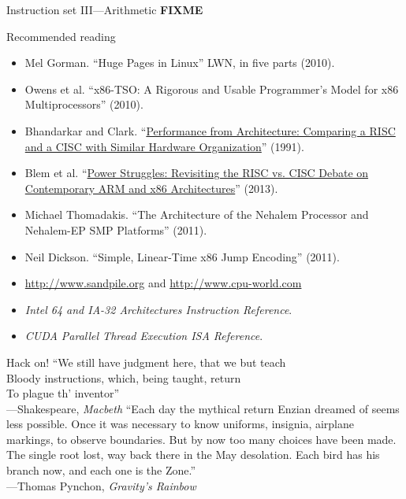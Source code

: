 \documentclass[mathserif,xcolor={dvipsnames,table}]{beamer}
\begin{document}
\begin{frame}{Instruction set III---Arithmetic}
\huge\textbf{FIXME}
\end{frame}

\begin{frame}{Recommended reading}
\footnotesize{
\begin{itemize}
\item Mel Gorman. ``Huge Pages in Linux'' LWN, in five parts (2010).
\item Owens et al. ``x86-TSO: A Rigorous and Usable Programmer's Model for x86 Multiprocessors'' (2010).
\item Bhandarkar and Clark. ``\href{http://dl.acm.org/citation.cfm?id=107003}{Performance from Architecture: Comparing a
RISC and a CISC with Similar Hardware Organization}'' (1991).
\vfill
\item Blem et al. ``\href{http://research.cs.wisc.edu/vertical/papers/2013/hpca13-isa-power-struggles.pdf}{Power Struggles: Revisiting the RISC vs. CISC Debate on
Contemporary ARM and x86 Architectures}'' (2013).
\vfill
\item Michael Thomadakis. ``The Architecture of the Nehalem Processor and
Nehalem-EP SMP Platforms'' (2011).
\vfill
\item Neil Dickson. ``Simple, Linear-Time x86 Jump Encoding'' (2011).
\vfill
\item \href{http://www.sandpile.org}{http://www.sandpile.org} and 
\href{http://www.cpu-world.com}{http://www.cpu-world.com}
\vfill
\item \textit{Intel 64 and IA-32 Architectures Instruction Reference}.
\vfill
\item \textit{CUDA Parallel Thread Execution ISA Reference}.
\end{itemize}
}
\end{frame}

\begin{frame}{Hack on!}
``We still have judgment here, that we but teach\\
Bloody instructions, which, being taught, return\\
To plague th' inventor''\\
\hfill---Shakespeare, \textit{Macbeth}
\vfill
``Each day the mythical return Enzian dreamed of seems less possible. Once it
was necessary to know uniforms, insignia, airplane markings, to observe
boundaries. But by now too many choices have been made. The single root lost,
way back there in the May desolation. Each bird has his branch now, and each
one is the Zone.''\\
\hfill---Thomas Pynchon, \textit{Gravity's Rainbow}
\end{frame}

\begin{frame}
\end{frame}
\end{document}

